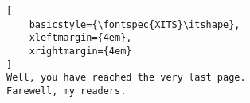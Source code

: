 \cleardoublepage

\clearpage
\mbox{}%
\thispagestyle{empty}

\clearpage
\thispagestyle{empty}

\null\vfil

\begin{lstlisting}[
    basicstyle={\fontspec{XITS}\itshape},
    xleftmargin={4em},
    xrightmargin={4em}
]
Well, you have reached the very last page.
Farewell, my readers.
\end{lstlisting}

\vfil\null
